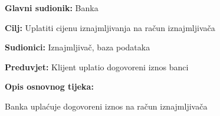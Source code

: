 						\noindent {}
						\begin{packed_item}
							
							\item \textbf{Glavni sudionik: }Banka
							\item  \textbf{Cilj: }Uplatiti cijenu iznajmljivanja na račun iznajmljivača 
							\item  \textbf{Sudionici: }Iznajmljivač, baza podataka
							\item  \textbf{Preduvjet: }Klijent uplatio dogovoreni iznos banci
							\item  \textbf{Opis osnovnog tijeka:}
							
							\item[] \begin{packed_enum}
								
								\item Banka uplaćuje dogovoreni iznos na račun iznajmljivača 
								
							\end{packed_enum}
							
							
						\end{packed_item}
						\noindent {}
